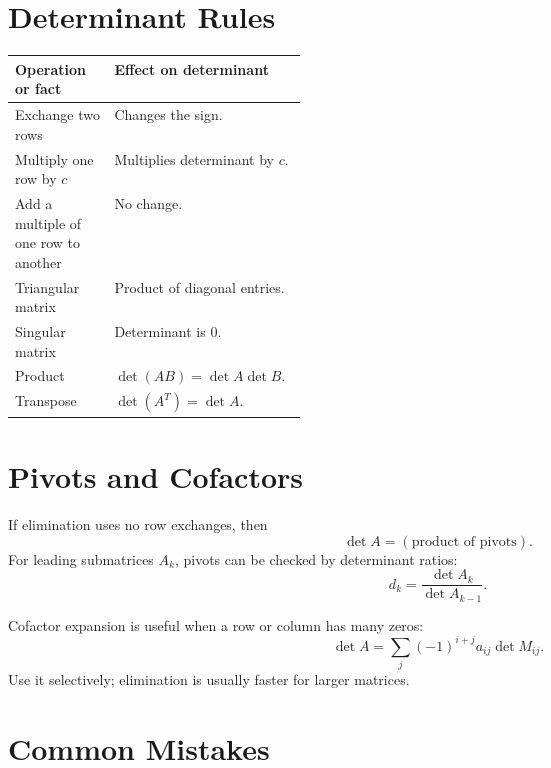 \documentclass[10pt]{article}
\begin{document}
\section{Determinant Rules}

\begin{center}
\small
\begin{tabularx}{\linewidth}{@{}L{0.34\linewidth}Y@{}}
\toprule
Operation or fact & Effect on determinant \\
\midrule
Exchange two rows & Changes the sign. \\
Multiply one row by \(c\) & Multiplies determinant by \(c\). \\
Add a multiple of one row to another & No change. \\
Triangular matrix & Product of diagonal entries. \\
Singular matrix & Determinant is \(0\). \\
Product & \(\det(AB)=\det A\det B\). \\
Transpose & \(\det(A^{T})=\det A\). \\
\bottomrule
\end{tabularx}
\end{center}


\section{Pivots and Cofactors}

If elimination uses no row exchanges, then
\[
\det A=(\text{product of pivots}).
\]
For leading submatrices \(A_k\), pivots can be checked by determinant ratios:
\[
d_k=\frac{\det A_k}{\det A_{k-1}}.
\]

Cofactor expansion is useful when a row or column has many zeros:
\[
\det A=\sum_j (-1)^{i+j}a_{ij}\det M_{ij}.
\]
Use it selectively; elimination is usually faster for larger matrices.

\section{Common Mistakes}
\end{document}
